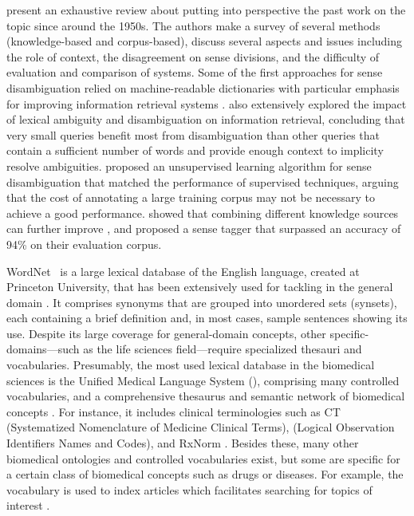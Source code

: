 \textcite{ide1998a} present an exhaustive review about  putting into perspective the past work on the topic since around the 1950s.
The authors make a survey of several methods (knowledge-based and corpus-based), discuss several aspects and issues including the role of context, the disagreement on sense divisions, and the difficulty of evaluation and comparison of systems.
Some of the first approaches for sense disambiguation relied on machine-readable dictionaries \parencite{lesk1986a,veronis1990a} with particular emphasis for improving information retrieval systems \parencite{krovetz1989a}.
\textcite{sanderson1994a,sanderson1996a} also extensively explored the impact of lexical ambiguity and disambiguation on information retrieval, concluding that very small queries benefit most from disambiguation than other queries that contain a sufficient number of words and provide enough context to implicity resolve ambiguities.
\textcite{yarowsky1995a} proposed an unsupervised learning algorithm for sense disambiguation that matched the performance of supervised techniques, arguing that the cost of annotating a large training corpus may not be necessary to achieve a good  performance.
\textcite{stevenson2001a} showed that combining different knowledge sources can further improve , and proposed a sense tagger that surpassed an accuracy of 94\% on their evaluation corpus.

WordNet~\parencite{fellbaum1998a,miller1995a} is a large lexical database of the English language, created at Princeton University, that has been extensively used for tackling  in the general domain \parencite{banerjee2002a,loureiro2019a}.
It comprises synonyms that are grouped into unordered sets (synsets), each containing a brief definition and, in most cases, sample sentences showing its use.
Despite its large coverage for general-domain concepts, other specific-domains---such as the life sciences field---require specialized thesauri and vocabularies.
Presumably, the most used lexical database in the biomedical sciences is the Unified Medical Language System (), comprising many controlled vocabularies, and a comprehensive thesaurus and semantic network of biomedical concepts \parencite{bodenreider2004a}.
For instance, it includes clinical terminologies such as  CT (Systematized Nomenclature of Medicine Clinical Terms),  (Logical Observation Identifiers Names and Codes), and RxNorm \parencite{bodenreider2018a}.
Besides these, many other biomedical ontologies and controlled vocabularies exist, but some are specific for a certain class of biomedical concepts such as drugs or diseases.
For example, the  vocabulary is used to index  articles which facilitates searching for topics of interest \parencite{lipscomb2000a}.

